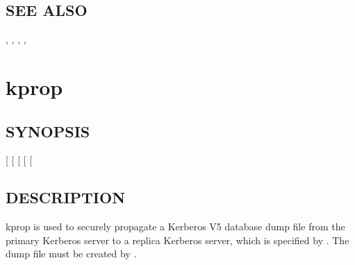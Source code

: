 \documentclass[letterpaper,10pt,english]{sphinxmanual}
\begin{document}
\subsection{SEE ALSO}
\label{\detokenize{admin/admin_commands/krb5kdc:see-also}}
\sphinxAtStartPar
{\hyperref[\detokenize{admin/admin_commands/kdb5_util:kdb5-util-8}]{}}, {\hyperref[\detokenize{admin/conf_files/kdc_conf:kdc-conf-5}]{}}, {\hyperref[\detokenize{admin/conf_files/krb5_conf:krb5-conf-5}]{}},
{\hyperref[\detokenize{admin/admin_commands/kdb5_ldap_util:kdb5-ldap-util-8}]{}}, 

\sphinxstepscope


\section{kprop}
\label{\detokenize{admin/admin_commands/kprop:kprop}}\label{\detokenize{admin/admin_commands/kprop:kprop-8}}\label{\detokenize{admin/admin_commands/kprop::doc}}

\subsection{SYNOPSIS}
\label{\detokenize{admin/admin_commands/kprop:synopsis}}
\sphinxAtStartPar
{}
{[} \sphinxstyleemphasis{realm}{]}
{[} \sphinxstyleemphasis{file}{]}
{[}\sphinxstylestrong{\sphinxhyphen{}d}{]}
{[} \sphinxstyleemphasis{port}{]}
{[} \sphinxstyleemphasis{keytab}{]}


\subsection{DESCRIPTION}
\label{\detokenize{admin/admin_commands/kprop:description}}
\sphinxAtStartPar
kprop is used to securely propagate a Kerberos V5 database dump file
from the primary Kerberos server to a replica Kerberos server, which is
specified by .  The dump file must be created by
{\hyperref[\detokenize{admin/admin_commands/kdb5_util:kdb5-util-8}]{}}.
\end{document}
